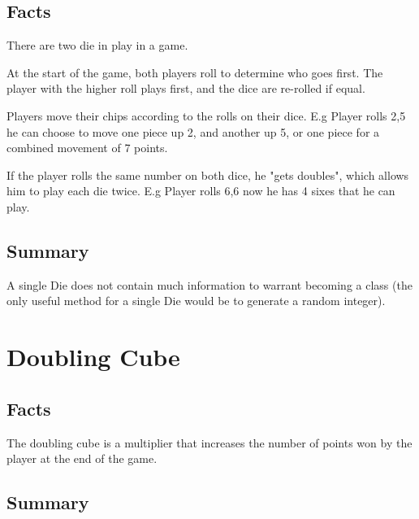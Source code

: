 \documentclass{report}
\begin{document}
\subsection{Facts}

\begin{dashed}
    \item There are two die in play in a game.
    \item At the start of the game, both players roll to determine who goes first.
The player with the higher roll plays first, and the dice are re-rolled if equal.
    \item Players move their chips according to the rolls on their dice.
        E.g Player rolls 2,5 he can choose to move one piece up 2, and another up 5,
        or one piece for a combined movement of 7 points.
    \item If the player rolls the same number on both dice, he "gets doubles", which
        allows him to play each die twice.
        E.g Player rolls 6,6 now he has 4 sixes that he can play.

\end{dashed}

\subsection{Summary}

A single Die does not contain much information to warrant becoming a class (the
only useful method for a single Die would be to generate a random integer).

\section{Doubling Cube}

\subsection{Facts}
\begin{dashed}
\item The doubling cube is a multiplier that increases the number of points won by the player
    at the end of the game.
\end{dashed}

\subsection{Summary}
\end{document}
